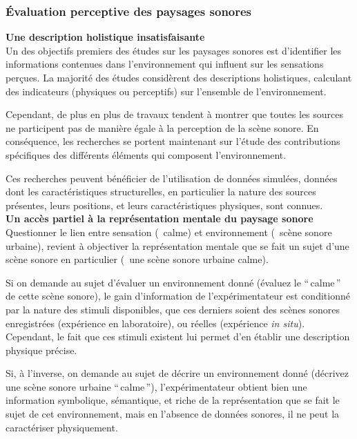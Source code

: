 \subsubsection{Évaluation perceptive des paysages sonores}

\textbf{Une description holistique insatisfaisante}\\

Un des objectifs premiers des études sur les paysages sonores est d'identifier les informations contenues dans l'environnement qui influent sur les sensations perçues. La majorité des études considèrent des descriptions holistiques, calculant des indicateurs (physiques ou perceptifs) sur l'ensemble de l'environnement.

Cependant, de plus en plus de travaux tendent à montrer que toutes les sources ne participent pas de manière égale à la perception de la scène sonore. En conséquence, les recherches se portent maintenant sur l'étude des contributions spécifiques des différents éléments qui composent l'environnement.

Ces recherches peuvent bénéficier de l'utilisation de données simulées, données dont les caractéristiques structurelles, en particulier la nature des sources présentes, leurs positions, et leurs caractéristiques physiques, sont connues. \\

{\setlength{\parindent}{0cm}\textbf{Un accès partiel à la représentation mentale du paysage sonore}} \\

Questionner le lien entre sensation (\eg~calme) et environnement (\eg~scène sonore urbaine), revient à objectiver la représentation mentale que se fait un sujet d'une scène sonore en particulier (\eg~une scène sonore urbaine calme).

Si on demande au sujet d'évaluer un environnement donné (évaluez le ``\,calme\,'' de cette scène sonore), le gain d'information de l'expérimentateur est conditionné par la nature des stimuli disponibles, que ces derniers soient des scènes sonores enregistrées (expérience en laboratoire), ou réelles (expérience \emph{in situ}). Cependant, le fait que ces stimuli existent lui permet d'en établir une description physique précise.

Si, à l'inverse, on demande au sujet de décrire un environnement donné (décrivez une scène sonore urbaine ``\,calme\,''), l'expérimentateur obtient bien une information symbolique, sémantique, et riche de la représentation que se fait le sujet de cet environnement, mais en l'absence de données sonores, il ne peut la caractériser physiquement.

